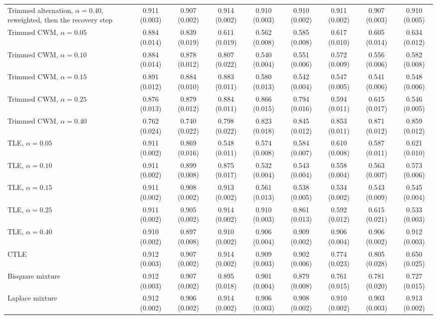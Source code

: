 \begin{table}[htbp]
{\begin{tabular}{lcccccccc}
Trimmed alternation, $\alpha=0.40$, reweighted, then the recovery step & 0.911 (0.003) & 0.907 (0.002) & 0.914 (0.002) & 0.910 (0.003) & 0.910 (0.002) & 0.911 (0.002) & 0.907 (0.003) & 0.910 (0.005) \\
Trimmed CWM, $\alpha=0.05$ & 0.884 (0.014) & 0.839 (0.019) & 0.611 (0.019) & 0.562 (0.008) & 0.585 (0.008) & 0.617 (0.010) & 0.605 (0.014) & 0.634 (0.012) \\
Trimmed CWM, $\alpha=0.10$ & 0.884 (0.014) & 0.878 (0.012) & 0.807 (0.022) & 0.540 (0.004) & 0.551 (0.006) & 0.572 (0.009) & 0.556 (0.006) & 0.582 (0.008) \\
Trimmed CWM, $\alpha=0.15$ & 0.891 (0.012) & 0.884 (0.010) & 0.883 (0.011) & 0.580 (0.013) & 0.542 (0.004) & 0.547 (0.005) & 0.541 (0.006) & 0.548 (0.006) \\
Trimmed CWM, $\alpha=0.25$ & 0.876 (0.013) & 0.879 (0.012) & 0.884 (0.011) & 0.866 (0.015) & 0.794 (0.016) & 0.594 (0.011) & 0.615 (0.017) & 0.546 (0.005) \\
Trimmed CWM, $\alpha=0.40$ & 0.762 (0.024) & 0.740 (0.022) & 0.798 (0.022) & 0.823 (0.018) & 0.845 (0.012) & 0.853 (0.011) & 0.871 (0.012) & 0.859 (0.012) \\
TLE, $\alpha=0.05$ & 0.911 (0.002) & 0.869 (0.016) & 0.548 (0.011) & 0.574 (0.008) & 0.584 (0.007) & 0.610 (0.008) & 0.587 (0.011) & 0.621 (0.010) \\
TLE, $\alpha=0.10$ & 0.911 (0.002) & 0.899 (0.008) & 0.875 (0.017) & 0.532 (0.004) & 0.543 (0.004) & 0.558 (0.004) & 0.563 (0.007) & 0.573 (0.006) \\
TLE, $\alpha=0.15$ & 0.911 (0.002) & 0.908 (0.002) & 0.913 (0.002) & 0.561 (0.013) & 0.538 (0.005) & 0.534 (0.002) & 0.543 (0.009) & 0.545 (0.004) \\
TLE, $\alpha=0.25$ & 0.911 (0.002) & 0.905 (0.002) & 0.914 (0.002) & 0.910 (0.003) & 0.861 (0.013) & 0.592 (0.012) & 0.615 (0.021) & 0.533 (0.003) \\
TLE, $\alpha=0.40$ & 0.910 (0.002) & 0.897 (0.008) & 0.910 (0.002) & 0.906 (0.004) & 0.909 (0.002) & 0.906 (0.004) & 0.906 (0.002) & 0.912 (0.003) \\
CTLE & 0.912 (0.003) & 0.907 (0.002) & 0.914 (0.002) & 0.909 (0.003) & 0.902 (0.006) & 0.774 (0.023) & 0.805 (0.028) & 0.650 (0.025) \\
Bisquare mixture & 0.912 (0.003) & 0.907 (0.002) & 0.895 (0.018) & 0.901 (0.004) & 0.879 (0.008) & 0.761 (0.015) & 0.781 (0.020) & 0.727 (0.015) \\
Laplace mixture & 0.912 (0.002) & 0.906 (0.002) & 0.914 (0.002) & 0.906 (0.003) & 0.908 (0.002) & 0.910 (0.002) & 0.903 (0.003) & 0.913 (0.002) \\

\end{tabular}}
\end{table}
